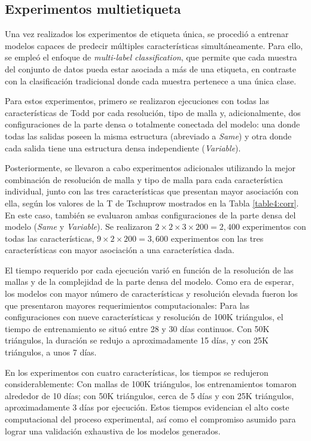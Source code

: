 \subsection{Experimentos multietiqueta}
Una vez realizados los experimentos de etiqueta única, se procedió a entrenar modelos capaces de predecir múltiples características simultáneamente. Para ello, se empleó el enfoque de \textit{multi-label classification}, que permite que cada muestra del conjunto de datos pueda estar asociada a más de una etiqueta, en contraste con la clasificación tradicional donde cada muestra pertenece a una única clase.

Para estos experimentos, primero se realizaron ejecuciones con todas las características de Todd por cada resolución, tipo de malla y, adicionalmente, dos configuraciones de la parte densa o totalmente conectada del modelo: una donde todas las salidas poseen la misma estructura (abreviado a \textit{Same}) y otra donde cada salida tiene una estructura densa independiente (\textit{Variable}).

Posteriormente, se llevaron a cabo experimentos adicionales utilizando la mejor combinación de resolución de malla y tipo de malla para cada característica individual, junto con las tres características que presentan mayor asociación con ella, según los valores de la T de Tschuprow mostrados en la Tabla \ref{table4:corr}. En este caso, también se evaluaron ambas configuraciones de la parte densa del modelo (\textit{Same} y \textit{Variable}). Se realizaron $2 \times 2 \times 3 \times 200 = 2,400$ experimentos con todas las características, $9 \times 2 \times 200 = 3,600$ experimentos con las tres características con mayor asociación a una característica dada.

El tiempo requerido por cada ejecución varió en función de la resolución de las mallas y de la complejidad de la parte densa del modelo. Como era de esperar, los modelos con mayor número de características y resolución elevada fueron los que presentaron mayores requerimientos computacionales: Para las configuraciones con nueve características y resolución de 100K triángulos, el tiempo de entrenamiento se situó entre 28 y 30 días continuos. Con 50K triángulos, la duración se redujo a aproximadamente 15 días, y con 25K triángulos, a unos 7 días.

En los experimentos con cuatro características, los tiempos se redujeron considerablemente: Con mallas de 100K triángulos, los entrenamientos tomaron alrededor de 10 días; con 50K triángulos, cerca de 5 días y con 25K triángulos, aproximadamente 3 días por ejecución. Estos tiempos evidencian el alto coste computacional del proceso experimental, así como el compromiso asumido para lograr una validación exhaustiva de los modelos generados.

